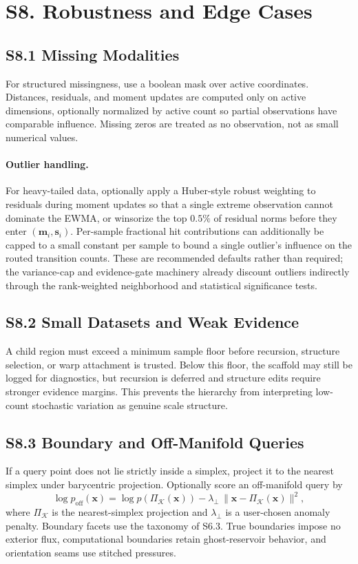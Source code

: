 \documentclass[11pt]{article}
\begin{document}
\section*{S8. Robustness and Edge Cases}

\subsection*{S8.1 Missing Modalities}
For structured missingness, use a boolean mask over active coordinates. Distances, residuals, and moment updates are computed only on active dimensions, optionally normalized by active count so partial observations have comparable influence. Missing zeros are treated as no observation, not as small numerical values.

\paragraph{Outlier handling.}
For heavy-tailed data, optionally apply a Huber-style robust weighting to residuals during moment updates so that a single extreme observation cannot dominate the EWMA, or winsorize the top $0.5\%$ of residual norms before they enter $(\mathbf m_i,\mathbf s_i)$. Per-sample fractional hit contributions can additionally be capped to a small constant per sample to bound a single outlier's influence on the routed transition counts. These are recommended defaults rather than required; the variance-cap and evidence-gate machinery already discount outliers indirectly through the rank-weighted neighborhood and statistical significance tests.

\subsection*{S8.2 Small Datasets and Weak Evidence}
A child region must exceed a minimum sample floor before recursion, structure selection, or warp attachment is trusted. Below this floor, the scaffold may still be logged for diagnostics, but recursion is deferred and structure edits require stronger evidence margins. This prevents the hierarchy from interpreting low-count stochastic variation as genuine scale structure.

\subsection*{S8.3 Boundary and Off-Manifold Queries}
If a query point does not lie strictly inside a simplex, project it to the nearest simplex under barycentric projection. Optionally score an off-manifold query by
\[
\log p_{\mathrm{off}}(\mathbf x)
=
\log p(\Pi_{\mathcal K}(\mathbf x))
-\lambda_{\perp}\,\|\mathbf x-\Pi_{\mathcal K}(\mathbf x)\|^2,
\]
where $\Pi_{\mathcal K}$ is the nearest-simplex projection and $\lambda_\perp$ is a user-chosen anomaly penalty. Boundary facets use the taxonomy of S6.3. True boundaries impose no exterior flux, computational boundaries retain ghost-reservoir behavior, and orientation seams use stitched pressures.
\end{document}
